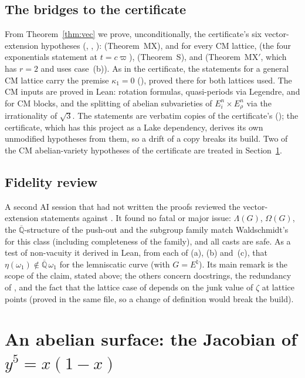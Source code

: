 \documentclass[11pt]{amsart}
\theoremstyle{definition}
\theoremstyle{remark}
\numberwithin{equation}{section}
\newcommand{\Qbar}{\overline{\mathbb{Q}}}
\newcommand{\vp}{\varpi}
\begin{document}
\subsection{The bridges to the certificate}
From Theorem~\ref{thm:vec} we prove, unconditionally, the certificate's six vector-extension hypotheses
(, , ): 
(Theorem~MX),  and  for every CM lattice, 
(the four exponentials statement at $t=c\vp$),  (Theorem~S), and 
(Theorem~MX$'$, which has $r=2$ and uses case~(b)). As in the certificate, the statements for a general CM
lattice carry the premise $\kappa_1=0$ (), proved there for both lattices used. The CM
inputs are proved in Lean: rotation formulas, quasi-periods via Legendre,  and
 for CM blocks, and the splitting of abelian subvarieties of $E_i^n\times E_\rho^n$ via the
irrationality of $\sqrt3$. The statements are verbatim copies of the certificate's
(); the certificate, which has this project as a Lake dependency, derives its
own unmodified hypotheses from them, so a drift of a copy breaks its build. Two of the CM abelian-variety
hypotheses of the certificate are treated in Section~\ref{sec:abvar}.

\subsection{Fidelity review}
A second AI session that had not written the proofs reviewed the vector-extension statements against
\cite[pp.~375, 385--389, 394--395]{W88}. It found no fatal or major issue: $\Lambda(G)$, $\Omega(G)$, the
$\Qbar$-structure of the push-out and the subgroup family match Waldschmidt's for this class (including
completeness of the family), and all casts are safe. As a test of non-vacuity it derived in Lean, from each
of (a), (b) and~(c), that $\eta(\omega_1)\notin\Qbar\,\omega_1$ for the lemniscatic curve (with $G=E^\natural$). Its main
remark is the scope of the claim, stated above; the others concern docstrings, the redundancy of
, and the fact that the lattice case of  depends on the junk value of $\zeta$ at
lattice points (proved in the same file, so a change of definition would break the build).

\section{An abelian surface: the Jacobian of \texorpdfstring{$y^5=x(1-x)$}{y\^{}5=x(1-x)}}\label{sec:abvar}
\end{document}
